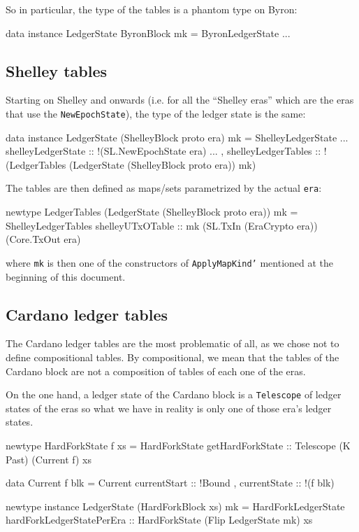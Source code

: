 \documentclass[11pt,a4paper]{article}
\newcommand{\htt}[1]{\texttt{#1}}
\theoremstyle{definition}
\begin{document}
So in particular, the type of the tables is a phantom type on Byron:

\begin{code}
data instance LedgerState ByronBlock mk = ByronLedgerState {
  ...
}
\end{code}

\subsection{Shelley tables}

Starting on Shelley and onwards (i.e. for all the ``Shelley eras'' which are the eras that use the \htt{NewEpochState}), the type of the ledger state is the same:

\begin{code}
data instance LedgerState (ShelleyBlock proto era) mk = ShelleyLedgerState {
  ...
  shelleyLedgerState      :: !(SL.NewEpochState era)
  ...
, shelleyLedgerTables     ::
      !(LedgerTables (LedgerState (ShelleyBlock proto era)) mk)
}
\end{code}

The tables are then defined as maps/sets parametrized by the actual \texttt{era}:

\begin{code}
newtype LedgerTables (LedgerState (ShelleyBlock proto era)) mk =
  ShelleyLedgerTables {
    shelleyUTxOTable :: mk (SL.TxIn (EraCrypto era)) (Core.TxOut era)
  }
\end{code}

where \htt{mk} is then one of the constructors of \htt{ApplyMapKind'} mentioned
at the beginning of this document.

\subsection{Cardano ledger tables}

The Cardano ledger tables are the most problematic of all, as we chose not to
define compositional tables. By compositional, we mean that the tables of the
Cardano block are not a composition of tables of each one of the eras.

On the one hand, a ledger state of the Cardano block is a \htt{Telescope} of
ledger states of the eras so what we have in reality is only one of those era's
ledger states.

\begin{code}
newtype HardForkState f xs = HardForkState {
      getHardForkState :: Telescope (K Past) (Current f) xs
    }

data Current f blk = Current {
      currentStart :: !Bound
    , currentState :: !(f blk)
    }

newtype instance LedgerState (HardForkBlock xs) mk = HardForkLedgerState {
      hardForkLedgerStatePerEra :: HardForkState (Flip LedgerState mk) xs
    }
\end{code}
\end{document}
